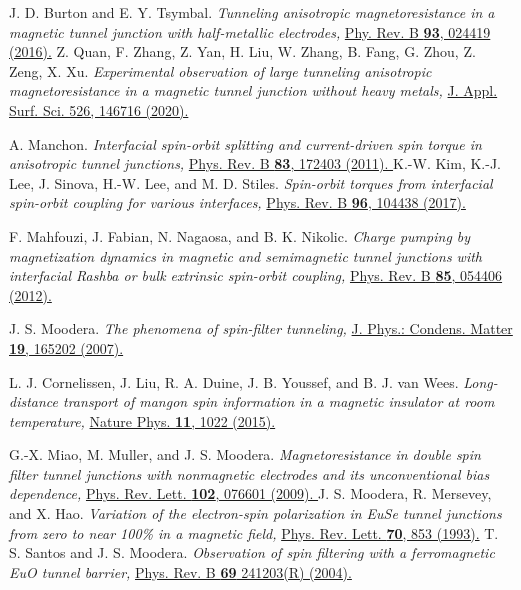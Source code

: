 \documentclass[10pt,pr,twocolumn,showpacs,amssymb,floatfix,superscriptaddress]{revtex4-1}
\begin{document}
\begin{thebibliography}{999}
 J. D. Burton and E. Y. Tsymbal.
\textit{Tunneling anisotropic magnetoresistance in a magnetic tunnel junction with half-metallic electrodes,}
\href{https://doi.org/10.1103/PhysRevB.93.024419}{Phy. Rev. B {\bf 93}, 024419 (2016).}
Z. Quan, F. Zhang, Z. Yan, H. Liu, W. Zhang, B. Fang, G. Zhou, Z. Zeng, X. Xu.
\textit{Experimental observation of large tunneling anisotropic magnetoresistance in a magnetic tunnel junction without heavy metals,}
\href{https://doi.org/10.1016/j.apsusc.2020.146716}{J. Appl. Surf. Sci. 526, 146716 (2020).}



A. Manchon. 
\textit{Interfacial spin-orbit splitting and current-driven spin torque in anisotropic tunnel junctions,}
\href{https://doi.org/10.1103/PhysRevB.83.172403}{Phys. Rev. B {\bf 83}, 172403 (2011). }
K.-W. Kim, K.-J. Lee, J. Sinova, H.-W. Lee, and M. D. Stiles. 
\textit{Spin-orbit torques from interfacial spin-orbit coupling for various interfaces,}
\href{https://doi.org/10.1103/PhysRevB.96.104438}{Phys. Rev. B {\bf 96}, 104438 (2017).}

F. Mahfouzi, J. Fabian, N. Nagaosa, and B. K. Nikolic. 
\textit{Charge pumping by magnetization dynamics in magnetic and semimagnetic tunnel junctions with interfacial Rashba or bulk extrinsic spin-orbit coupling,}
\href{https://doi.org/10.1103/PhysRevB.85.054406}{Phys. Rev. B {\bf 85}, 054406 (2012).}







 J. S. Moodera. 
\textit{The phenomena of spin-filter tunneling,}
\href{https://doi.org/10.1088/0953-8984/19/16/165202}{J. Phys.: Condens. Matter {\bf 19}, 165202 (2007).}

 L. J. Cornelissen, J. Liu, R. A. Duine, J. B. Youssef, and B. J. van Wees. 
\textit{Long-distance transport of mangon spin information in a magnetic insulator at room temperature,}
\href{https://doi.org/10.1038/nphys3465}{Nature Phys. {\bf 11}, 1022 (2015).}

 G.-X. Miao, M. Muller, and J. S. Moodera. 
\textit{Magnetoresistance in double spin filter tunnel junctions with nonmagnetic electrodes and its unconventional bias dependence,}
\href{https://doi.org/10.1103/PhysRevLett.102.076601}{Phys. Rev. Lett. {\bf 102}, 076601 (2009). }
J. S. Moodera, R. Mersevey, and X. Hao. 
\textit{Variation of the electron-spin polarization in EuSe tunnel junctions from zero to near 100\% in a magnetic field,}
\href{https://doi.org/10.1103/PhysRevLett.70.853}{ Phys. Rev. Lett. {\bf 70}, 853 (1993).}
T. S. Santos and J. S. Moodera. 
\textit{Observation of spin filtering with a ferromagnetic EuO tunnel barrier,}
\href{https://doi.org/10.1103/PhysRevB.69.241203}{Phys. Rev. B {\bf 69} 241203(R) (2004).}


\end{thebibliography}
\end{document}

